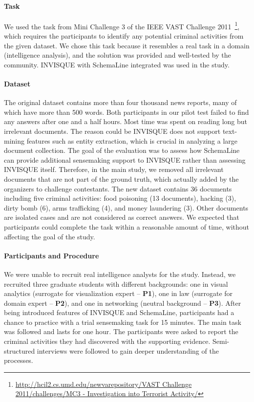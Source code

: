 \paragraph{Task}
We used the task from Mini Challenge 3 of the IEEE VAST Challenge 2011~\footnote{\url{http://hcil2.cs.umd.edu/newvarepository/VAST Challenge 2011/challenges/MC3 - Investigation into Terrorist Activity/}}, which requires the participants to identify any potential criminal activities from the given dataset. We chose this task because it resembles a real task in a domain (intelligence analysis), and the solution was provided and well-tested by the community. INVISQUE with SchemaLine integrated was used in the study. 

\paragraph{Dataset}
The original dataset contains more than four thousand news reports, many of which have more than 500 words. Both participants in our pilot test failed to find any answers after one and a half hours. Most time was spent on reading long but irrelevant documents. The reason could be INVISQUE does not support text-mining features such as entity extraction, which is crucial in analyzing a large document collection. The goal of the evaluation was to assess how SchemaLine can provide additional sensemaking support to INVISQUE rather than assessing INVISQUE itself. Therefore, in the main study, we removed all irrelevant documents that are not part of the ground truth, which actually added by the organizers to challenge contestants. The new dataset contains 36 documents including five criminal activities:  food poisoning (13 documents), hacking (3), dirty bomb (6), arms trafficking (4), and money laundering (3). Other documents are isolated cases and are not considered as correct answers. We expected that  participants could complete the task within a reasonable amount of time, without affecting the goal of the study. 

\paragraph{Participants and Procedure}
We were unable to recruit real intelligence analysts for the study. Instead, we recruited three graduate students with different backgrounds:  one in visual analytics (surrogate for visualization expert -- \textbf{P1}), one in law (surrogate for domain expert -- \textbf{P2}), and one in networking (neutral background -- \textbf{P3}). After being introduced features of INVISQUE and SchemaLine, participants had a chance to practice with a trial sensemaking task for 15 minutes. The main task was followed and lasts for one hour. The participants were asked to report the criminal activities they had discovered with the supporting evidence. Semi-structured interviews were followed to gain deeper understanding of the processes.

